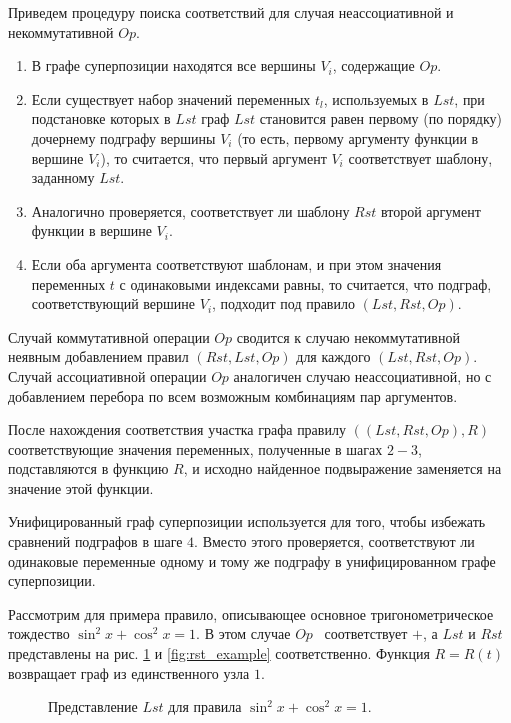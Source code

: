 \documentclass[12pt,a4paper]{article}
\begin{document}
Приведем процедуру поиска соответствий для случая неассоциативной и
некоммутативной $Op$.
\begin{enumerate}
  \item В графе суперпозиции находятся все вершины $V_i$, содержащие $Op$.
  \item Если существует набор значений переменных $t_l$, используемых в $Lst$,
	при подстановке которых в $Lst$ граф $Lst$ становится равен первому (по
	порядку) дочернему подграфу вершины $V_i$ (то есть, первому аргументу
	функции в вершине $V_i$), то считается, что первый аргумент $V_i$
	соответствует шаблону, заданному $Lst$.
  \item Аналогично проверяется, соответствует ли шаблону $Rst$ второй аргумент
	функции в вершине $V_i$.
  \item Если оба аргумента соответствуют шаблонам, и при этом значения
	переменных $t$ с одинаковыми индексами равны, то считается, что подграф,
	соответствующий вершине $V_i$, подходит под правило $(Lst, Rst, Op)$.
\end{enumerate}
Случай коммутативной операции $Op$ сводится к случаю некоммутативной неявным добавлением
правил $(Rst, Lst, Op)$ для каждого $(Lst, Rst, Op)$.
Случай ассоциативной операции $Op$ аналогичен случаю неассоциативной, но с добавлением
перебора по всем возможным комбинациям пар аргументов.

После нахождения соответствия участка графа правилу $((Lst, Rst, Op), R)$ соответствующие
значения переменных, полученные в шагах $2-3$, подставляются в функцию $R$, и исходно
найденное подвыражение заменяется на значение этой функции.

Унифицированный граф суперпозиции используется для того, чтобы избежать сравнений подграфов
в шаге $4$. Вместо этого проверяется, соответствуют ли одинаковые переменные одному и тому
же подграфу в унифицированном графе суперпозиции.

Рассмотрим для примера правило, описывающее основное тригонометрическое
тождество $\sin^2 x + \cos^2 x = 1$. В этом случае $Op$~ соответствует $+$, а
$Lst$ и $Rst$ представлены на рис. \ref{fig:lst_example} и \ref{fig:rst_example}
соответственно. Функция $R = R(t)$ возвращает граф из единственного узла $1$.

\begin{figure}[h]
  \centering
  \caption{Представление $Lst$ для правила $\sin^2 x + \cos^2 x = 1$.}
  \label{fig:lst_example}
\end{figure}
\end{document}
